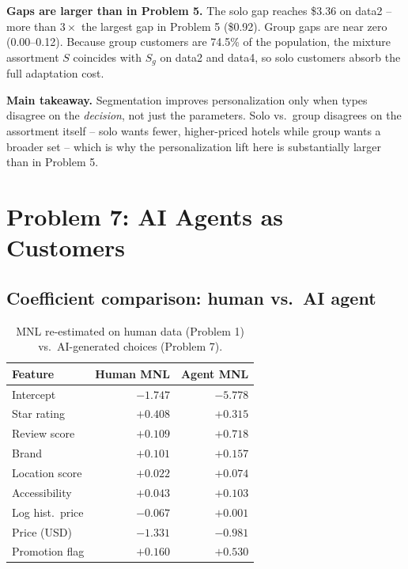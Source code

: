 \documentclass[11pt]{article}
\begin{document}
\textbf{Gaps are larger than in Problem 5.} The solo gap reaches \$3.36 on data2 -- more than $3\times$ the largest gap in Problem 5 (\$0.92). Group gaps are near zero (0.00--0.12). Because group customers are 74.5\% of the population, the mixture assortment $S$ coincides with $S_g$ on data2 and data4, so solo customers absorb the full adaptation cost.

\textbf{Main takeaway.} Segmentation improves personalization only when types disagree on the \textit{decision}, not just the parameters. Solo vs.\ group disagrees on the assortment itself -- solo wants fewer, higher-priced hotels while group wants a broader set -- which is why the personalization lift here is substantially larger than in Problem 5.

\section{Problem 7: AI Agents as Customers}

\subsection*{Coefficient comparison: human vs.\ AI agent}

\begin{table}[h]
\centering
\begin{tabular}{lrr}
\toprule
Feature & Human MNL & Agent MNL \\
\midrule
Intercept            & $-1.747$ & $-5.778$ \\
Star rating          & $+0.408$ & $+0.315$ \\
Review score         & $+0.109$ & $+0.718$ \\
Brand                & $+0.101$ & $+0.157$ \\
Location score       & $+0.022$ & $+0.074$ \\
Accessibility        & $+0.043$ & $+0.103$ \\
Log hist.\ price     & $-0.067$ & $+0.001$ \\
Price (USD)          & $-1.331$ & $-0.981$ \\
Promotion flag       & $+0.160$ & $+0.530$ \\
\bottomrule
\end{tabular}
\caption{MNL re-estimated on human data (Problem 1) vs.\ AI-generated choices (Problem 7).}
\end{table}
\end{document}
